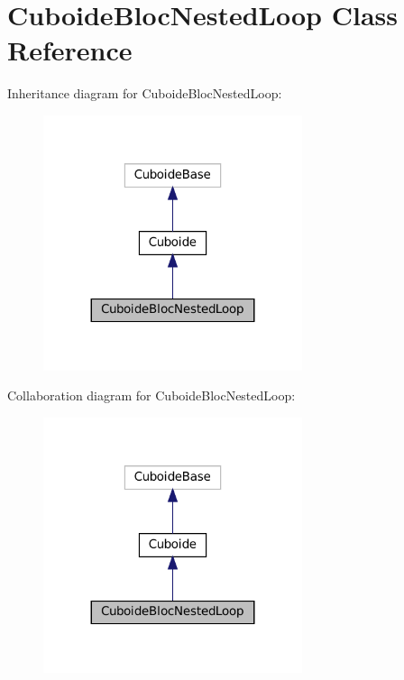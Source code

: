 \hypertarget{class_cuboide_bloc_nested_loop}{}\section{Cuboide\+Bloc\+Nested\+Loop Class Reference}
\label{class_cuboide_bloc_nested_loop}


Inheritance diagram for Cuboide\+Bloc\+Nested\+Loop\+:\nopagebreak
\begin{figure}[H]
\begin{center}
\leavevmode
\includegraphics[width=215pt]{class_cuboide_bloc_nested_loop__inherit__graph}
\end{center}
\end{figure}


Collaboration diagram for Cuboide\+Bloc\+Nested\+Loop\+:\nopagebreak
\begin{figure}[H]
\begin{center}
\leavevmode
\includegraphics[width=215pt]{class_cuboide_bloc_nested_loop__coll__graph}
\end{center}
\end{figure}
